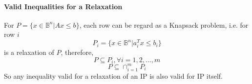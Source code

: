                 \paragraph{Valid Inequalities for a Relaxation}
                    For $P=\{x\in \mathbb{B}^n | Ax\le b\}$, each row can be regard as a Knapsack problem, i.e. for row $i$
                    \begin{equation*}
                        P_i = \{x\in \mathbb{B}^n | a_i^T x \le b_i\} 
                    \end{equation*}
                    is a relaxation of $P$, therefore,
                    \begin{equation*}
                        P\subseteq P_i, \forall i=1,2,...,m 
                    \end{equation*}
                    \begin{equation*}
                        P\subseteq \cap_{i=1}^m P_i 
                    \end{equation*}
                    So any inequality valid for a relaxation of an IP is also valid for IP itself.
                    
